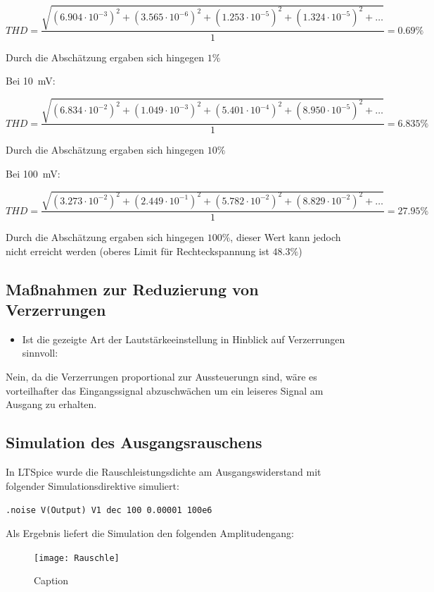 \begin{equation*}
    THD = \frac{\sqrt{(6.904\cdot10^{-3})^2 + (3.565\cdot10^{-6})^2 + (1.253\cdot10^{-5})^2 +(1.324\cdot10^{-5})^2 + \ldots}}{1} = 0.69 \%
\end{equation*}

Durch die Abschätzung ergaben sich hingegen $1\%$

Bei \SI{10}{\milli \volt}:

\begin{equation*}
    THD = \frac{\sqrt{(6.834\cdot10^{-2})^2 + (1.049\cdot10^{-3})^2 + (5.401\cdot10^{-4})^2 +(8.950\cdot10^{-5})^2 + \ldots}}{1} = 6.835 \%
\end{equation*}

Durch die Abschätzung ergaben sich hingegen $10\%$

Bei \SI{100}{\milli \volt}:

\begin{equation*}
    THD = \frac{\sqrt{(3.273\cdot10^{-2})^2 + (2.449\cdot10^{-1})^2 + (5.782\cdot10^{-2})^2 +(8.829\cdot10^{-2})^2 + \ldots}}{1} = 27.95 \%
\end{equation*}

Durch die Abschätzung ergaben sich hingegen $100\%$, dieser Wert kann jedoch nicht erreicht werden (oberes Limit für Rechteckspannung ist $48.3 \%$)

\subsection{Maßnahmen zur Reduzierung von Verzerrungen}

\begin{itemize}
    \item Ist die gezeigte Art der Lautstärkeeinstellung in Hinblick auf Verzerrungen sinnvoll:
\end{itemize}

Nein, da die Verzerrungen proportional zur Aussteuerungn sind, wäre es vorteilhafter das Eingangssignal abzuschwächen um ein leiseres Signal am Ausgang zu erhalten.

\subsection{Simulation des Ausgangsrauschens}

In LTSpice wurde die Rauschleistungsdichte am Ausgangswiderstand mit folgender Simulationsdirektive simuliert:

\texttt{.noise V(Output) V1 dec 100 0.00001 100e6}

Als Ergebnis liefert die Simulation den folgenden Amplitudengang:

\begin{figure}
    \centering
    \texttt{[image: Rauschle]}
    \caption{Caption}
    \label{fig:my_label}
\end{figure}